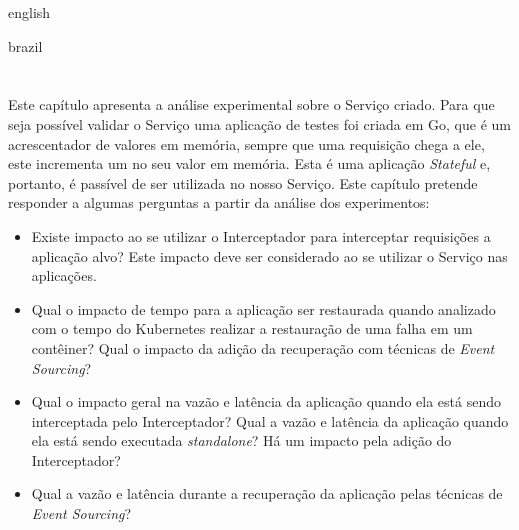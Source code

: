

\begin{otherlanguage*}{english}


\begin{otherlanguage*}{brazil}

\chapter{} \label{cap:analise:experimental}

Este capítulo apresenta a análise experimental sobre o Serviço criado. Para que seja possível
validar o Serviço uma aplicação de testes foi criada em Go, que é um acrescentador de valores
em memória, sempre que uma requisição chega a ele, este incrementa um no seu valor em memória.
Esta é uma aplicação \textit{Stateful} e, portanto, é passível de ser utilizada no nosso Serviço.
Este capítulo pretende responder a algumas perguntas a partir da análise dos experimentos:

\begin{itemize}
	\item Existe impacto ao se utilizar o Interceptador para interceptar requisições a
	aplicação alvo? Este impacto deve ser considerado ao se utilizar o Serviço nas
	aplicações.
	\item Qual o impacto de tempo para a aplicação ser restaurada quando analizado com
	o tempo do Kubernetes realizar a restauração de uma falha em um contêiner? Qual o
	impacto da adição da recuperação com técnicas de \textit{Event Sourcing}?
	\item Qual o impacto geral na vazão e latência da aplicação quando ela está sendo
	interceptada pelo Interceptador? Qual a vazão e latência da aplicação quando ela
	está sendo executada \textit{standalone}? Há um impacto pela adição do Interceptador?
	\item Qual a vazão e latência durante a recuperação da aplicação pelas técnicas de
	\textit{Event Sourcing}?
\end{itemize}


\end{otherlanguage*}
\end{otherlanguage*}
